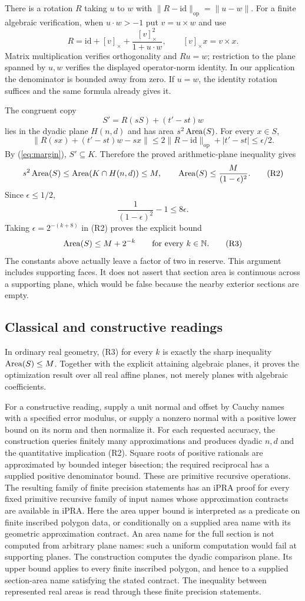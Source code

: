 There is a rotation $R$ taking $u$ to $w$ with
$\|R-\mathrm{id}\|_{\mathrm{op}}=\|u-w\|$.
For a finite algebraic verification, when $u\cdot w>-1$ put
$v=u\times w$ and use
\[
 R=\mathrm{id}+[v]_\times+\frac{[v]_\times^2}{1+u\cdot w},
 \qquad [v]_\times x=v\times x.
\]
Matrix multiplication verifies orthogonality and $Ru=w$; restriction
to the plane spanned by $u,w$ verifies the displayed operator-norm
identity. In our application the denominator is bounded away from
zero. If $u=w$, the identity rotation suffices and the same formula
already gives it.

The congruent copy
\[
 S'=R(sS)+(t'-st)w
\]
lies in the dyadic plane $H(n,d)$ and has area $s^2\operatorname{Area}(S)$.
For every $x\in S$,
\[
 \|R(sx)+(t'-st)w-sx\|
 \le2\|R-\mathrm{id}\|_{\mathrm{op}}+|t'-st|
 \le\epsilon/2.
\]
By (\ref{eq:margin}), $S'\subseteq K$. Therefore the proved
arithmetic-plane inequality gives
\[
 s^2\operatorname{Area}(S)\le\operatorname{Area}(K\cap H(n,d))\le M,
 \qquad \operatorname{Area}(S)\le\frac{M}{(1-\epsilon)^2}.        \tag{R2}
\]
Since $\epsilon\le1/2$,
\[
 \frac1{(1-\epsilon)^2}-1\le8\epsilon.
\]
Taking $\epsilon=2^{-(k+8)}$ in (R2) proves the explicit bound
\[
 \operatorname{Area}(S)\le M+2^{-k}
 \qquad\hbox{for every }k\in\mathbb N.             \tag{R3}
\]
The constants above actually leave a factor of two in reserve.
This argument includes supporting faces. It does not assert that
section area is continuous across a supporting plane, which would be
false because the nearby exterior sections are empty.

\subsection{Classical and constructive readings}
In ordinary real geometry, (R3) for every $k$ is exactly the sharp
inequality $\operatorname{Area}(S)\le M$. Together with the explicit attaining
algebraic planes, it proves the optimization result over all real
affine planes, not merely planes with algebraic coefficients.

For a constructive reading, supply a unit normal and offset by Cauchy
names with a specified error modulus, or supply a nonzero normal
with a positive lower bound on its norm and then normalize it. For
each requested accuracy, the construction queries finitely many
approximations and produces dyadic $n,d$ and the quantitative
implication (R2). Square roots of positive rationals are approximated
by bounded integer bisection; the required reciprocal has a supplied
positive denominator bound. These are primitive recursive
operations. The resulting family of finite precision statements
has an iPRA proof for every fixed primitive recursive family of
input names whose approximation contracts are available in iPRA.
Here the area upper bound is interpreted as a predicate on finite
inscribed polygon data, or conditionally on a supplied area name with
its geometric approximation contract. An area name for the full
section is not computed from arbitrary plane names: such a uniform
computation would fail at supporting planes. The construction computes
the dyadic comparison plane. Its upper bound applies to every finite
inscribed polygon, and hence to a supplied section-area name satisfying
the stated contract. The inequality between represented real areas is
read through these finite precision statements.

